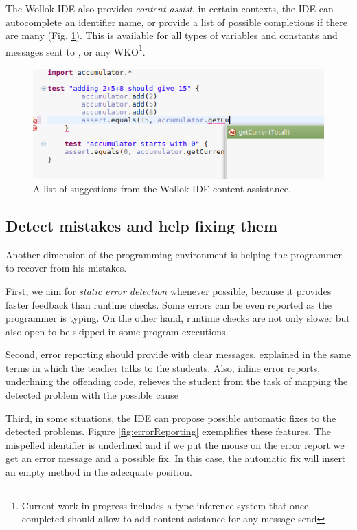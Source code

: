 The Wollok IDE also provides \emph{content assist}, 
\ie in certain contexts, the IDE can autocomplete an identifier name, or provide a list of possible completions if there are many (\cf Fig. \ref{fig:codeCompletion}).
This is available for all types of variables and constants and messages sent to ,  or any WKO\footnote{Current work in progress includes a type inference system that once completed should allow to add content asistance for any message send}. 
 
\begin{figure}[ht]
 \centering
 \includegraphics[scale=0.45]{images/codeCompletion.png}
 \caption{\small A list of suggestions from the Wollok IDE content assistance.}
 \label{fig:codeCompletion}
\end{figure}

\subsection{Detect mistakes and help fixing them}
\label{sec:detectMistakes}
Another dimension of the programming environment is helping the programmer to recover from his mistakes. 

First, we aim for \emph{static error detection} whenever possible, because it provides faster feedback than runtime checks.
Some errors can be even reported as the programmer is typing.
On the other hand, runtime checks are not only slower but also open to be skipped in some program executions.

Second, error reporting should provide with clear messages, explained in the same terms in which the teacher talks to the students. 
Also, inline error reports, \eg underlining the offending code, relieves the student from the task of mapping the detected problem with the possible cause 

Third, in some situations, the IDE can propose possible automatic fixes to the detected problems.
Figure \ref{fig:errorReporting} exemplifies these features. The mispelled identifier is underlined and if we put the mouse on the error report we get an error message and a possible fix.
In this case, the automatic fix will insert an empty method in the adecquate position.

